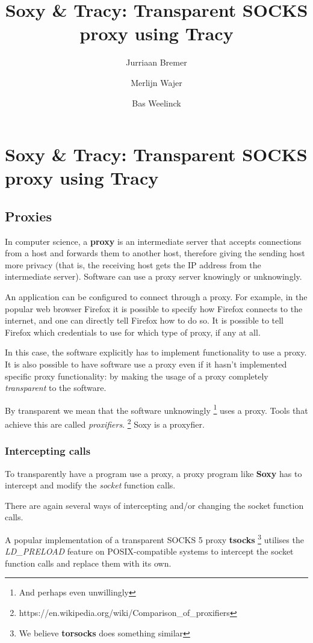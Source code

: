 \documentclass[a4paper]{article}
\author{Jurriaan Bremer \and Merlijn Wajer \and Bas Weelinck}
\title{Soxy \& Tracy: Transparent SOCKS proxy using Tracy}
\begin{document}
\maketitle

\section{Soxy \& Tracy: Transparent SOCKS proxy using Tracy}

\subsection{Proxies}
In computer science, a \textbf{proxy} is an intermediate server that
accepts connections from a host and forwards them to another host,
therefore giving the sending host more privacy (that is, the
receiving host gets the IP address from the intermediate server).
Software can use a proxy server knowingly or unknowingly.

An application can be configured to connect through a proxy. For example, in
the popular web browser Firefox it is possible to specify how Firefox connects
to the internet, and one can directly tell Firefox how to do so.
It is possible to tell Firefox which credentials to use for which type of proxy,
if any at all.

In this case, the software explicitly has to implement functionality to use a
proxy. It is also possible to have software use a proxy even if it hasn't
implemented specific proxy functionality: by making the usage of a proxy
completely \textit{transparent} to the software.

By transparent we mean that the software unknowingly
\footnote{And perhaps even unwillingly} uses a proxy. Tools that achieve this
are called \textit{proxifiers}.
\footnote{https://en.wikipedia.org/wiki/Comparison\_of\_proxifiers}
Soxy is a proxyfier.

\subsubsection{Intercepting calls}

To transparently have a program use a proxy, a proxy program like \textbf{Soxy}
has to intercept and modify the \textit{socket} function calls.

There are again several ways of intercepting and/or changing the socket function
calls.

A popular implementation of a transparent SOCKS 5 proxy \textbf{tsocks}
\footnote{We believe \textbf{torsocks} does something similar}
utilises the \textit{LD\_PRELOAD} feature on POSIX-compatible systems to
intercept the socket function calls and replace them with its own.
\end{document}
